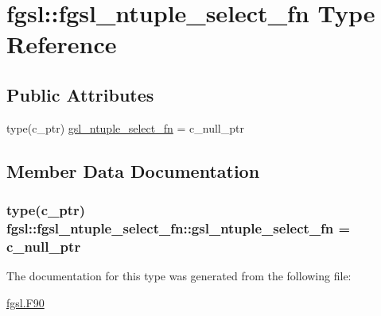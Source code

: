 \hypertarget{structfgsl_1_1fgsl__ntuple__select__fn}{}\section{fgsl\+:\+:fgsl\+\_\+ntuple\+\_\+select\+\_\+fn Type Reference}
\label{structfgsl_1_1fgsl__ntuple__select__fn}
\subsection*{Public Attributes}
\begin{DoxyCompactItemize}
\item 
type(c\+\_\+ptr) \hyperlink{structfgsl_1_1fgsl__ntuple__select__fn_addb721eac032c0a2e4b45dfd7cbb036e}{gsl\+\_\+ntuple\+\_\+select\+\_\+fn} = c\+\_\+null\+\_\+ptr
\end{DoxyCompactItemize}


\subsection{Member Data Documentation}
\hypertarget{structfgsl_1_1fgsl__ntuple__select__fn_addb721eac032c0a2e4b45dfd7cbb036e}{}
\subsubsection[{gsl\+\_\+ntuple\+\_\+select\+\_\+fn}]{\setlength{\rightskip}{0pt plus 5cm}type(c\+\_\+ptr) fgsl\+::fgsl\+\_\+ntuple\+\_\+select\+\_\+fn\+::gsl\+\_\+ntuple\+\_\+select\+\_\+fn = c\+\_\+null\+\_\+ptr}\label{structfgsl_1_1fgsl__ntuple__select__fn_addb721eac032c0a2e4b45dfd7cbb036e}


The documentation for this type was generated from the following file\+:\begin{DoxyCompactItemize}
\item 
\hyperlink{fgsl_8F90}{fgsl.\+F90}\end{DoxyCompactItemize}
